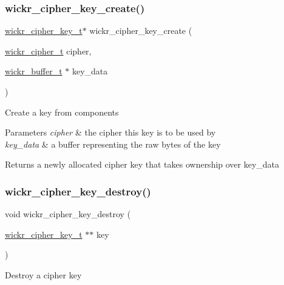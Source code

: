 \subsubsection{\texorpdfstring{wickr\+\_\+cipher\+\_\+key\+\_\+create()}{wickr\_cipher\_key\_create()}}
{\footnotesize\ttfamily \mbox{\hyperlink{structwickr__cipher__key}{wickr\+\_\+cipher\+\_\+key\+\_\+t}}$\ast$ wickr\+\_\+cipher\+\_\+key\+\_\+create (\begin{DoxyParamCaption}\item[{\mbox{\hyperlink{structwickr__cipher}{wickr\+\_\+cipher\+\_\+t}}}]{cipher,  }\item[{\mbox{\hyperlink{structwickr__buffer}{wickr\+\_\+buffer\+\_\+t}} $\ast$}]{key\+\_\+data }\end{DoxyParamCaption})}

Create a key from components


\begin{DoxyParams}{Parameters}
{\em cipher} & the cipher this key is to be used by \\
\hline
{\em key\+\_\+data} & a buffer representing the raw bytes of the key \\
\hline
\end{DoxyParams}
\begin{DoxyReturn}{Returns}
a newly allocated cipher key that takes ownership over \textquotesingle{}key\+\_\+data\textquotesingle{} 
\end{DoxyReturn}
\mbox{\label{group__wickr__cipher_ga45790b3023ccb261c03346b069aca763}} 
\subsubsection{\texorpdfstring{wickr\+\_\+cipher\+\_\+key\+\_\+destroy()}{wickr\_cipher\_key\_destroy()}}
{\footnotesize\ttfamily void wickr\+\_\+cipher\+\_\+key\+\_\+destroy (\begin{DoxyParamCaption}\item[{\mbox{\hyperlink{structwickr__cipher__key}{wickr\+\_\+cipher\+\_\+key\+\_\+t}} $\ast$$\ast$}]{key }\end{DoxyParamCaption})}

Destroy a cipher key


